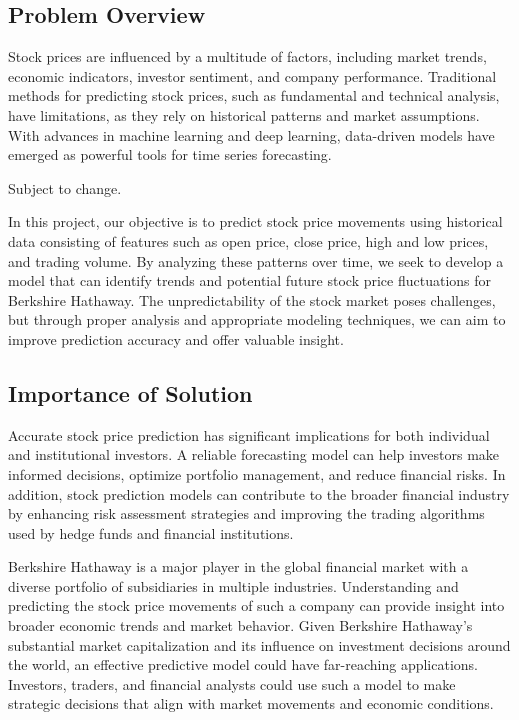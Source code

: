 \documentclass[conference]{IEEEtran}
\begin{document}
\subsection{Problem Overview}
Stock prices are influenced by a multitude of factors, including market trends, economic indicators, investor sentiment, and company performance. Traditional methods for predicting stock prices, such as fundamental and technical analysis, have limitations, as they rely on historical patterns and market assumptions. With advances in machine learning and deep learning, data-driven models have emerged as powerful tools for time series forecasting.

Subject to change.

In this project, our objective is to predict stock price movements using historical data consisting of features such as open price, close price, high and low prices, and trading volume. By analyzing these patterns over time, we seek to develop a model that can identify trends and potential future stock price fluctuations for Berkshire Hathaway. The unpredictability of the stock market poses challenges, but through proper analysis and appropriate modeling techniques, we can aim to improve prediction accuracy and offer valuable insight.

\subsection{Importance of Solution}
Accurate stock price prediction has significant implications for both individual and institutional investors. A reliable forecasting model can help investors make informed decisions, optimize portfolio management, and reduce financial risks. In addition, stock prediction models can contribute to the broader financial industry by enhancing risk assessment strategies and improving the trading algorithms used by hedge funds and financial institutions.

Berkshire Hathaway is a major player in the global financial market with a diverse portfolio of subsidiaries in multiple industries. Understanding and predicting the stock price movements of such a company can provide insight into broader economic trends and market behavior. Given Berkshire Hathaway’s substantial market capitalization and its influence on investment decisions around the world, an effective predictive model could have far-reaching applications. Investors, traders, and financial analysts could use such a model to make strategic decisions that align with market movements and economic conditions.
\end{document}
